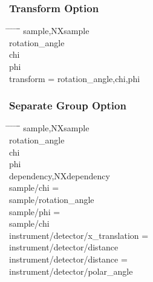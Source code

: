 \documentclass{beamer}
\begin{document}
\begin{frame} \frametitle{Transform Option}
\begin{tabbing}
\hspace*{1cm} \= \hspace*{1cm} \= \hspace*{1cm} \= \hspace*{1cm} \= \hspace*{1cm} \= \hspace*{1cm}\= \kill
\>sample,NXsample\\
\> \>rotation\_angle\\
\> \>chi \\
\> \>phi \\
\> \>transform = rotation\_angle,chi,phi \\
\end{tabbing}
\end{frame}


\begin{frame} \frametitle{Separate Group Option}
\begin{tabbing}
\hspace*{1cm} \= \hspace*{1cm} \= \hspace*{1cm} \= \hspace*{1cm} \= \hspace*{1cm} \= \hspace*{1cm}\= \kill
\>sample,NXsample\\
\> \>rotation\_angle\\
\> \>chi \\
\> \>phi \\
\>dependency,NXdependency\\
\> \>sample/chi = \\
\> \> \>sample/rotation\_angle\\
\> \>sample/phi =\\
\> \> \> sample/chi\\
\> \>instrument/detector/x\_translation = \\
\> \> \>instrument/detector/distance\\
\> \>instrument/detector/distance = \\
\> \> \>instrument/detector/polar\_angle\\
\end{tabbing}
\end{frame}
\end{document}
